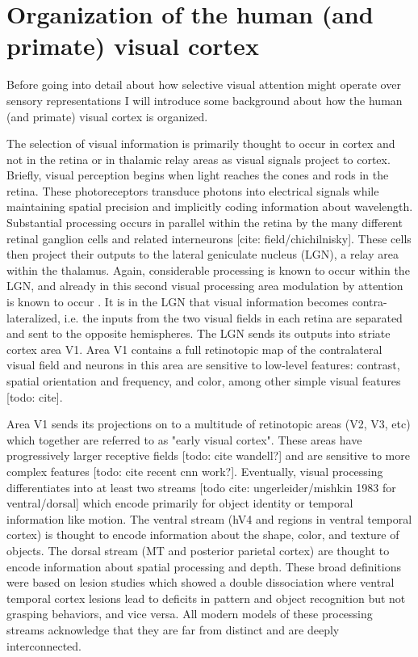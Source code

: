 \section{Organization of the human (and primate) visual cortex}

Before going into detail about how selective visual attention might operate over sensory representations I will introduce some background about how the human (and primate) visual cortex is organized. 

The selection of visual information is primarily thought to occur in cortex and not in the retina or in thalamic relay areas as visual signals project to cortex. Briefly, visual perception begins when light reaches the cones and rods in the retina. These photoreceptors transduce photons into electrical signals while maintaining spatial precision and implicitly coding information about wavelength. Substantial processing occurs in parallel within the retina by the many different retinal ganglion cells and related interneurons [cite: field/chichilnisky]. These cells then project their outputs to the lateral geniculate nucleus (LGN), a relay area within the thalamus. Again, considerable processing is known to occur within the LGN, and already in this second visual processing area modulation by attention is known to occur \citep{OConnor2002-mx}. It is in the LGN that visual information becomes contra-lateralized, i.e. the inputs from the two visual fields in each retina are separated and sent to the opposite hemispheres. The LGN sends its outputs into striate cortex area V1. Area V1 contains a full retinotopic map of the contralateral visual field and neurons in this area are sensitive to low-level features: contrast, spatial orientation and frequency, and color, among other simple visual features [todo: cite].

Area V1 sends its projections on to a multitude of retinotopic areas (V2, V3, etc) which together are referred to as "early visual cortex". These areas have progressively larger receptive fields [todo: cite wandell?] and are sensitive to more complex features [todo: cite recent cnn work?]. Eventually, visual processing differentiates into at least two streams [todo cite: ungerleider/mishkin 1983 for ventral/dorsal] which encode primarily for object identity or temporal information like motion. The ventral stream (hV4 and regions in ventral temporal cortex) is thought to encode information about the shape, color, and texture of objects. The dorsal stream (MT and posterior parietal cortex) are thought to encode information about spatial processing and depth. These broad definitions were based on lesion studies which showed a double dissociation where ventral temporal cortex lesions lead to deficits in pattern and object recognition but not grasping behaviors, and vice versa. All modern models of these processing streams acknowledge that they are far from distinct and are deeply interconnected.

